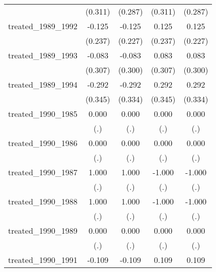 {\begin{tabular}{l*{4}{c}}
            &     (0.311)         &     (0.287)         &     (0.311)         &     (0.287)         \\
[1em]
treated\_1989\_1992&      -0.125         &      -0.125         &       0.125         &       0.125         \\
            &     (0.237)         &     (0.227)         &     (0.237)         &     (0.227)         \\
[1em]
treated\_1989\_1993&      -0.083         &      -0.083         &       0.083         &       0.083         \\
            &     (0.307)         &     (0.300)         &     (0.307)         &     (0.300)         \\
[1em]
treated\_1989\_1994&      -0.292         &      -0.292         &       0.292         &       0.292         \\
            &     (0.345)         &     (0.334)         &     (0.345)         &     (0.334)         \\
[1em]
treated\_1990\_1985&       0.000         &       0.000         &       0.000         &       0.000         \\
            &         (.)         &         (.)         &         (.)         &         (.)         \\
[1em]
treated\_1990\_1986&       0.000         &       0.000         &       0.000         &       0.000         \\
            &         (.)         &         (.)         &         (.)         &         (.)         \\
[1em]
treated\_1990\_1987&       1.000         &       1.000         &      -1.000         &      -1.000         \\
            &         (.)         &         (.)         &         (.)         &         (.)         \\
[1em]
treated\_1990\_1988&       1.000         &       1.000         &      -1.000         &      -1.000         \\
            &         (.)         &         (.)         &         (.)         &         (.)         \\
[1em]
treated\_1990\_1989&       0.000         &       0.000         &       0.000         &       0.000         \\
            &         (.)         &         (.)         &         (.)         &         (.)         \\
[1em]
treated\_1990\_1991&      -0.109         &      -0.109         &       0.109         &       0.109         \\

\end{tabular}}
